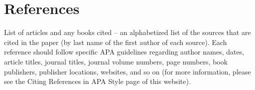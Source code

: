 \documentclass[12pt, letterpaper, twoside]{article}
\begin{document}
\section*{References}
List of articles and any books cited – an alphabetized list of the
sources that are cited in the paper (by last name of the first author of
each source).  Each reference should follow specific APA guidelines
regarding author names, dates, article titles, journal titles, journal
volume numbers, page numbers, book publishers, publisher locations,
websites, and so on (for more information, please see the Citing References
in APA Style page of this website).
\end{document}
